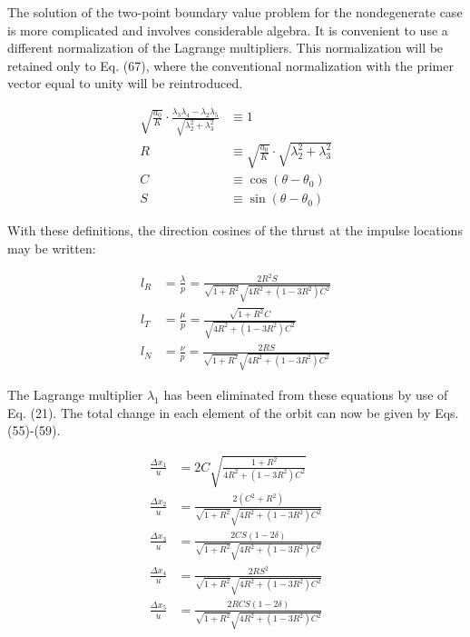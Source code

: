 \documentclass[12pt]{article}
\begin{document}
The solution of the two-point boundary value problem for the nondegenerate case is more complicated and involves considerable algebra. It is convenient to use a different normalization of the Lagrange multipliers. This normalization will be retained only to Eq. (67), where the conventional normalization with the primer vector equal to unity will be reintroduced.

\begin{align}
\sqrt{\frac{a_0}{K}} \cdot \frac{\lambda_3 \lambda_4 - \lambda_2 \lambda_5}{\sqrt{\lambda_2^2 + \lambda_3^2}} &\equiv 1 \tag{49} \\
R &\equiv \sqrt{\frac{a_0}{K}} \cdot \sqrt{\lambda_2^2 + \lambda_3^2} \tag{50} \\
C &\equiv \cos (\theta - \theta_0) \tag{51} \\
S &\equiv \sin (\theta - \theta_0) \tag{51}
\end{align}

With these definitions, the direction cosines of the thrust at the impulse locations may be written:

\begin{align}
l_R &= \frac{\lambda}{p} = \frac{2R^2 S}{\sqrt{1 + R^2} \sqrt{4R^2 + (1 - 3R^2) C^2}} \tag{52} \\
l_T &= \frac{\mu}{p} = \frac{\sqrt{1 + R^2} C}{\sqrt{4R^2 + (1 - 3R^2) C^2}} \tag{53} \\
l_N &= \frac{\nu}{p} = \frac{2RS}{\sqrt{1 + R^2} \sqrt{4R^2 + (1 - 3R^2) C^2}} \tag{54}
\end{align}

The Lagrange multiplier $\lambda_1$ has been eliminated from these equations by use of Eq. (21). The total change in each element of the orbit can now be given by Eqs. (55)-(59).

\begin{align}
\frac{\Delta x_1}{u} &= 2C \sqrt{\frac{1 + R^2}{4R^2 + (1 - 3R^2) C^2}} \tag{55} \\
\frac{\Delta x_2}{u} &= \frac{2(C^2 + R^2)}{\sqrt{1 + R^2} \sqrt{4R^2 + (1 - 3R^2) C^2}} \tag{56} \\
\frac{\Delta x_3}{u} &= \frac{2CS(1-2\delta)}{\sqrt{1 + R^2} \sqrt{4R^2 + (1 - 3R^2) C^2}} \tag{57} \\
\frac{\Delta x_4}{u} &= \frac{2RS^2}{\sqrt{1 + R^2} \sqrt{4R^2 + (1 - 3R^2) C^2}} \tag{58} \\
\frac{\Delta x_5}{u} &= \frac{2RCS(1-2\delta)}{\sqrt{1 + R^2} \sqrt{4R^2 + (1 - 3R^2) C^2}} \tag{59}
\end{align}
\end{document}
